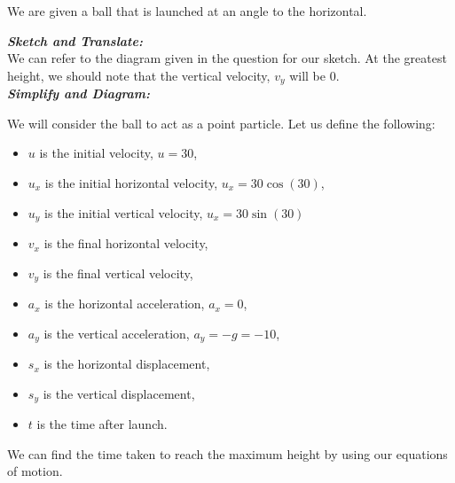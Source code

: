 %
%
%


\begin{subquestions}

We are given a ball that is launched at an angle to the horizontal.
	
\subquestion
	
\textbf{\textit{Sketch and Translate:}} \\
We can refer to the diagram given in the question for our sketch. At the greatest height, we should note that the vertical velocity, $v_y$ will be 0. \\




\textbf{\textit{Simplify and Diagram:}} 

We will consider the ball to act as a point particle. Let us define the following:
\begin{itemize}
	\item $u$ is the initial velocity, $u=30$,
	\item $u_x$ is the initial horizontal velocity, $u_x = 30\cos(30)$,
	\item $u_y$ is the initial vertical velocity, $u_x = 30\sin(30)$
	\item $v_x$ is the final horizontal velocity,
	\item $v_y$ is the final vertical velocity,
	\item $a_x$ is the horizontal acceleration, $a_x=0$,
	\item $a_y$ is the vertical acceleration, $a_y=-g=-10$,
	\item $s_x$ is the horizontal displacement,
	\item $s_y$ is the vertical displacement,
	\item $t$ is the time after launch.
\end{itemize}
We can find the time taken to reach the maximum height by using our equations of motion. \\
	

\end{subquestions}
